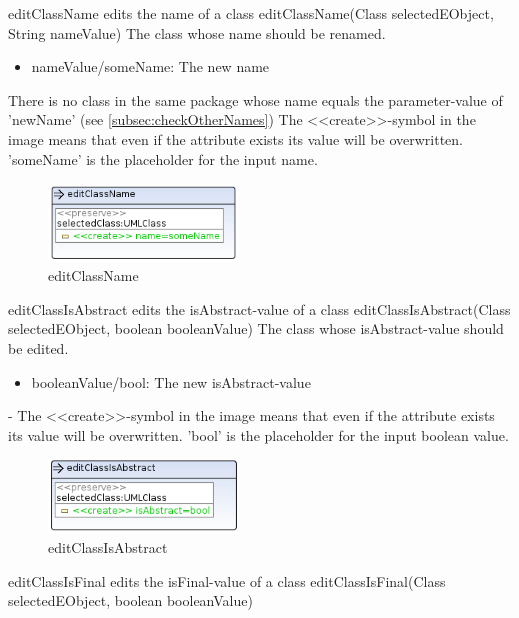 \op
{editClassName}
{edits the name of a class}
{editClassName(Class selectedEObject, String nameValue)}
{The class whose name should be renamed.}
{
\begin{itemize}
 \item nameValue/someName: The new name
\end{itemize}
}
{There is no class in the same package whose name equals the parameter-value of
'newName' (see
\ref{subsec:checkOtherNames})}
{The \textless\textless create\textgreater\textgreater  -symbol in the image
means that even if the attribute exists its value will be overwritten.
'someName' is the placeholder for the input name.}
\begin{figure}[H]
  \centering
  \includegraphics[width=0.45\textwidth]{pics/editClassName.png}
  \caption{editClassName}
  \label{editClassName}
\end{figure}
\op
{editClassIsAbstract}
{edits the isAbstract-value of a class}
{editClassIsAbstract(Class selectedEObject, boolean booleanValue)}
{The class whose isAbstract-value should be edited.}
{
\begin{itemize}
 \item booleanValue/bool: The new isAbstract-value
\end{itemize}
}
{-}
{The \textless\textless create\textgreater\textgreater  -symbol in the image
means that even if the attribute exists its value will be overwritten. 'bool'
is the placeholder for the input boolean value.}
\begin{figure}[H]
  \centering
  \includegraphics[width=0.45\textwidth]{pics/editClassIsAbstract.png}
  \caption{editClassIsAbstract}
  \label{editClassIsAbstract}
\end{figure}
\op
{editClassIsFinal}
{edits the isFinal-value of a class}
{editClassIsFinal(Class selectedEObject, boolean booleanValue)}
